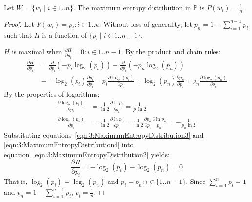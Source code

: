 \begin{thm}
  \label{thm:3:MaximumEntropyDistribution}
  Let $W=\{w_i \mid i \in 1 .. n\}$.
  The maximum entropy distribution in $\mathbb{P}$ is $P(w_i) = \frac{1}{n}$.
  \begin{proof}
    Let $P(w_i) = p_i : i\in 1 .. n$.
    Without loss of generality, let $p_n = 1 - \sum_{i = 1}^{n - 1} p_i$ such that
    $H$ is a function of $\{p_i \mid i \in 1 .. n - 1\}$.

    $H$ is maximal when $\frac{\partial H}{\partial p_i} = 0 : i \in 1 .. n - 1$.
    By the product and chain rules:
    \begin{align}
      \frac{\partial H}{\partial p_i}
       & = \frac{\partial}{\partial p_i}(- p_i \log_2(p_i))
      - \frac{\partial}{\partial p_i}(- p_n \log_2(p_n))
      \label{eqn:3:MaximumEntropyDistribution1}
      \\
       & = -\log_2(p_i) \frac{\partial p_i}{\partial p_i}
      - p_i \frac{\partial \log_2(p_i)}{\partial p_i}
      + \log_2(p_n) \frac{\partial p_n}{\partial p_i}
      + p_n \frac{\partial \log_2(p_n)}{\partial p_i}
      \label{eqn:3:MaximumEntropyDistribution2}
    \end{align}
    By the properties of logarithms:
    \begin{align}
      \frac{\partial \log_2(p_i)}{\partial p_i}
       & = \frac{1}{\ln 2} \frac{\partial \ln p_i}{\partial p_i}
      = \frac{1}{p_i \ln 2}
      \label{eqn:3:MaximumEntropyDistribution3}
      \\
      \frac{\partial \log_2(p_n)}{\partial p_i}
       & = \frac{1}{\ln 2} \frac{\partial \ln p_n}{\partial p_i}
      = \frac{1}{\ln 2} \frac{\partial p_n}{\partial p_i} \frac{\partial \ln p_n}{p_n}
      = - \frac{1}{p_n \ln 2}
      \label{eqn:3:MaximumEntropyDistribution4}
    \end{align}
    Substituting equations~\ref{eqn:3:MaximumEntropyDistribution3} and
    \ref{eqn:3:MaximumEntropyDistribution4} into
    equation~\ref{eqn:3:MaximumEntropyDistribution2} yields:
    \begin{equation}
      \frac{\partial H}{\partial p_i} = - \log_2(p_i) - \log_2(p_n) = 0
    \end{equation}
    That is, $\log_2(p_i) = \log_2(p_n)$ and $p_i = p_n : i \in \{ 1 .. n - 1 \}$.
    Since $\sum_{i = 1}^{n} p_i = 1$ and $p_n = 1 - \sum_{i = 1}^{n - 1} p_i$, $p_i
      = \frac{1}{n}$.
  \end{proof}
\end{thm}

